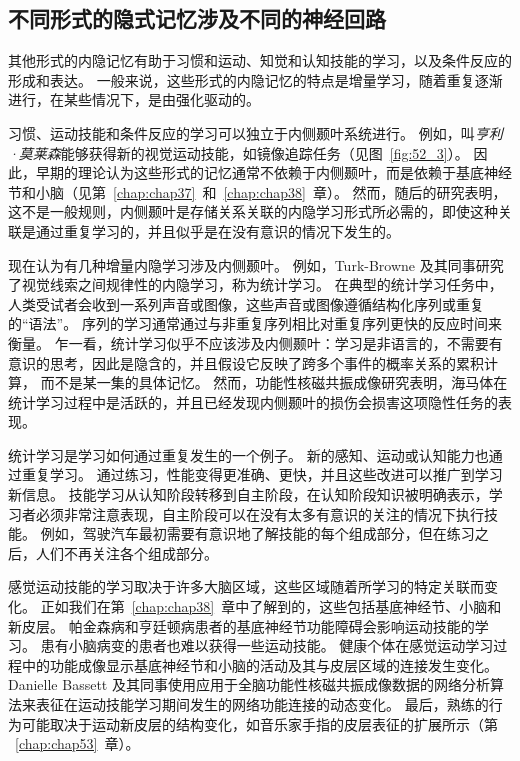 \subsection{不同形式的隐式记忆涉及不同的神经回路}

其他形式的内隐记忆有助于习惯和运动、知觉和认知技能的学习，以及条件反应的形成和表达。
一般来说，这些形式的内隐记忆的特点是增量学习，随着重复逐渐进行，在某些情况下，是由强化驱动的。


习惯、运动技能和条件反应的学习可以独立于内侧颞叶系统进行。
例如，叫\textit{亨利·莫莱森}能够获得新的视觉运动技能，如镜像追踪任务（见图~\ref{fig:52_3}）。
因此，早期的理论认为这些形式的记忆通常不依赖于内侧颞叶，而是依赖于基底神经节和小脑（见第~\ref{chap:chap37}~和~\ref{chap:chap38}~章）。
然而，随后的研究表明，这不是一般规则，内侧颞叶是存储关系关联的内隐学习形式所必需的，即使这种关联是通过重复学习的，并且似乎是在没有意识的情况下发生的。


现在认为有几种增量内隐学习涉及内侧颞叶。
例如，Turk-Browne 及其同事研究了视觉线索之间规律性的内隐学习，称为统计学习。
在典型的统计学习任务中，人类受试者会收到一系列声音或图像，这些声音或图像遵循结构化序列或重复的“语法”。
序列的学习通常通过与非重复序列相比对重复序列更快的反应时间来衡量。
乍一看，统计学习似乎不应该涉及内侧颞叶：学习是非语言的，不需要有意识的思考，因此是隐含的，并且假设它反映了跨多个事件的概率关系的累积计算， 而不是某一集的具体记忆。
然而，功能性核磁共振成像研究表明，海马体在统计学习过程中是活跃的，并且已经发现内侧颞叶的损伤会损害这项隐性任务的表现。


统计学习是学习如何通过重复发生的一个例子。
新的感知、运动或认知能力也通过重复学习。
通过练习，性能变得更准确、更快，并且这些改进可以推广到学习新信息。
技能学习从认知阶段转移到自主阶段，在认知阶段知识被明确表示，学习者必须非常注意表现，自主阶段可以在没有太多有意识的关注的情况下执行技能。
例如，驾驶汽车最初需要有意识地了解技能的每个组成部分，但在练习之后，人们不再关注各个组成部分。


感觉运动技能的学习取决于许多大脑区域，这些区域随着所学习的特定关联而变化。
正如我们在第~\ref{chap:chap38}~章中了解到的，这些包括基底神经节、小脑和新皮层。
帕金森病和亨廷顿病患者的基底神经节功能障碍会影响运动技能的学习。
患有小脑病变的患者也难以获得一些运动技能。
健康个体在感觉运动学习过程中的功能成像显示基底神经节和小脑的活动及其与皮层区域的连接发生变化。
Danielle Bassett 及其同事使用应用于全脑功能性核磁共振成像数据的网络分析算法来表征在运动技能学习期间发生的网络功能连接的动态变化。
最后，熟练的行为可能取决于运动新皮层的结构变化，如音乐家手指的皮层表征的扩展所示（第 ~\ref{chap:chap53}~章）。


